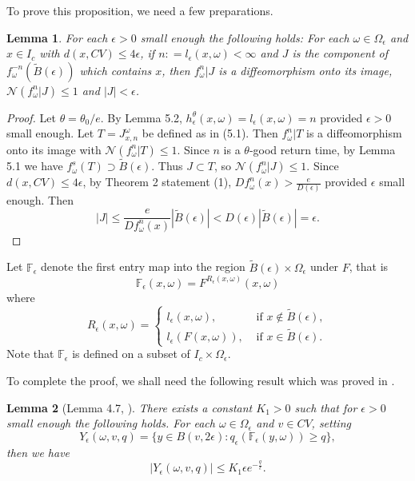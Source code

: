 \documentclass[11pt,oneside]{article}
\theoremstyle{plain}
\newtheorem{lem}{Lemma}[section]
\numberwithin{equation}{section}
\numberwithin{figure}{section}
\numberwithin{table}{section}
\begin{document}
To prove this proposition, we need a few preparations.


\begin{lem}
For each $\epsilon > 0$ small enough the following holds: For each $\omega \in \Omega_{\epsilon}$ and $x \in I_c$ with $d(x, CV) \leq 4 \epsilon$, if $n: = l_{\epsilon} (x, \omega) < \infty$ and $J$ is the component of $f_{\omega}^{-n} (\tilde B(\epsilon))$ which contains $x$, then $f_{\omega}^n |J$ is a diffeomorphism onto its image, $\mathcal N(f_{\omega}^n |J) \leq 1$ and $|J| < \epsilon$.
\end{lem}


\begin{proof}

Let $\theta = \theta_0 /e$. By Lemma 5.2, $h_{\epsilon}^{\theta} (x, \omega) = l_{\epsilon} (x, \omega)  = n$ provided $\epsilon >0$ small enough. Let $T = J_{x, n}^{\omega}$ be defined as in (5.1). Then $f_{\omega}^n |T$ is a diffeomorphism onto its image with $\mathcal N(f_{\omega}^n |T) \leq 1$. Since $n$ is a $\theta$-good return time, by Lemma 5.1 we have $f_{\omega}^s (T)  \supset  \tilde B(\epsilon)$. Thus $J \subset T$, so $\mathcal N(f_{\omega}^n | J) \leq 1$. Since $d(x, CV) \leq 4 \epsilon$, by Theorem 2 statement (1), $Df_{\omega}^n(x) > \frac{e}{D(\epsilon)}$ provided $\epsilon$ small enough. Then
\[
|J| \leq \frac{e}{Df_{\omega}^n(x)} |\tilde B(\epsilon)| < D(\epsilon) |\tilde B(\epsilon)| = \epsilon.
\]

\end{proof}


Let $\mathbb F_{\epsilon}$ denote the first entry map into the region $\tilde B(\epsilon) \times \Omega_{\epsilon}$ under $F$, that is 
\[
\mathbb F_{\epsilon} (x, \omega) = F^{R_{\epsilon}(x, \omega)}(x, \omega)
\]
where 
\[
R_{\epsilon}(x, \omega) = \begin{cases}
l_{\epsilon}(x, \omega), & \mbox{ if } x \notin \tilde B(\epsilon),\\
l_{\epsilon}(F(x, \omega)), & \mbox{ if } x \in \tilde B(\epsilon).
\end{cases}
\]
Note that $\mathbb F_{\epsilon}$ is defined on a subset of $I_c \times \Omega_{\epsilon}$.


To complete the proof, we shall need the following result which was proved in \cite{LR}.


\iffalse
\begin{lem}[Lemma 4.7, \cite{LR}]
There exists a constant $K_1>0$ such that for $\epsilon > 0$ small enough the following holds. For each $\omega \in \Omega_{\epsilon}$ and $v \in CV$, setting 
\[
Y_{\epsilon} (\omega, v, q) =  \{ y \in B(v, 2 \epsilon) : q_{\epsilon} (\mathbb F_{\epsilon} (y, \omega)) \geq q \},
\]
then we have
\[
|Y_{\epsilon} (\omega, v, q) | \leq K_1 \epsilon e^{ -\frac{q}{\ell}}.
\]
\end{lem}
\end{document}
